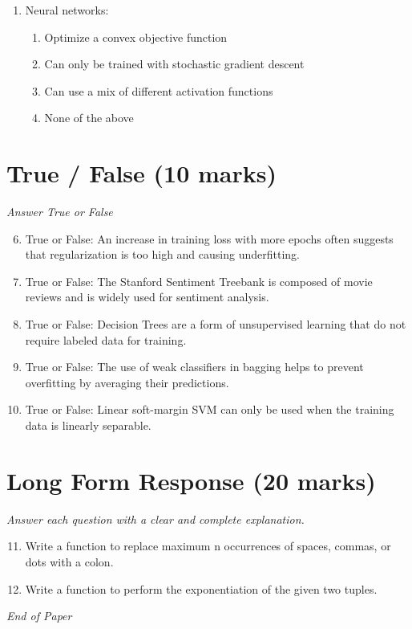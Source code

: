 \documentclass[12pt]{article}
\begin{document}
\begin{enumerate}[label=\arabic*.]
\begin{enumerate}[label=(\alph*)]
    \item The use of prior distributions on the parameters in a probabilistic model.
    \item The use of class priors in Gaussian Discriminant Analysis.
\end{enumerate}
\item Neural networks:
\begin{enumerate}[label=(\alph*)]
    \item Optimize a convex objective function
    \item Can only be trained with stochastic gradient descent
    \item Can use a mix of different activation functions
    \item None of the above
\end{enumerate}
\end{enumerate}

\section*{True / False (10 marks)}
\textit{Answer True or False}
\begin{enumerate}[label=\arabic*.]
\setcounter{enumi}{5}
\item True or False: An increase in training loss with more epochs often suggests that regularization is too high and causing underfitting.
\item True or False: The Stanford Sentiment Treebank is composed of movie reviews and is widely used for sentiment analysis.
\item True or False: Decision Trees are a form of unsupervised learning that do not require labeled data for training.
\item True or False: The use of weak classifiers in bagging helps to prevent overfitting by averaging their predictions.
\item True or False: Linear soft-margin SVM can only be used when the training data is linearly separable.
\end{enumerate}

\section*{Long Form Response (20 marks)}
\textit{Answer each question with a clear and complete explanation.}
\begin{enumerate}[label=\arabic*.]
\setcounter{enumi}{10}
\item Write a function to replace maximum n occurrences of spaces, commas, or dots with a colon.
\item Write a function to perform the exponentiation of the given two tuples.
\end{enumerate}

\vfill
\noindent\textit{End of Paper}
\end{document}
